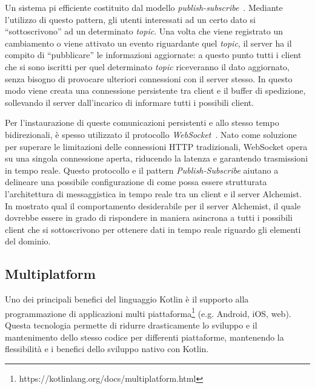 \par
Un sistema pi efficiente  costituito dal modello \textit{publish-subscribe}~\cite{pubsub}. Mediante l'utilizzo di questo
pattern, gli utenti interessati ad un certo dato si ``sottoscrivono'' ad un determinato \textit{topic}. Una volta che viene registrato un cambiamento
o viene attivato un evento riguardante quel \textit{topic}, il server ha il compito di ``pubblicare'' le informazioni aggiornate: a questo punto
tutti i client che si sono iscritti per quel determinato \textit{topic} riceveranno il dato aggiornato, senza bisogno di provocare ulteriori connessioni
con il server stesso. In questo modo viene creata una connessione persistente tra client e il buffer di spedizione, sollevando il server
dall'incarico di informare tutti i possibili client.

Per l'instaurazione di queste comunicazioni persistenti e allo stesso tempo bidirezionali, è spesso utilizzato il protocollo \textit{WebSocket}~\cite{websocket}.
Nato come soluzione per superare le limitazioni delle connessioni HTTP tradizionali, WebSocket opera su una singola connessione aperta, riducendo la
latenza e garantendo trasmissioni in tempo reale.
Questo protocollo e il pattern \textit{Publish-Subscribe} aiutano a delineare una possibile configurazione di come possa essere strutturata
l'architettura di messaggistica in tempo reale tra un client e il server Alchemist.
In   mostrato qual  il comportamento desiderabile per
il server Alchemist, il quale dovrebbe essere in grado di rispondere in maniera asincrona a tutti i possibili client che si sottoscrivono
per ottenere dati in tempo reale riguardo gli elementi del dominio.


\subsection{Multiplatform}\label{sec:multiplatform}
Uno dei principali benefici del linguaggio Kotlin è il supporto alla programmazione di applicazioni multi piattaforma\footnote{https://kotlinlang.org/docs/multiplatform.html}
(e.g. Android, iOS, web).
Questa tecnologia permette di ridurre drasticamente lo sviluppo e il mantenimento dello stesso codice per differenti piattaforme, mantenendo la
flessibilità e i benefici dello sviluppo nativo con Kotlin.

